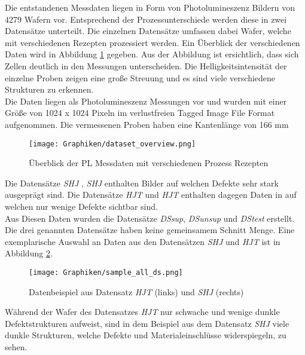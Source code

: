   Die entstandenen Messdaten liegen in Form von Photolumineszenz Bildern von 4279 Wafern vor. Entsprechend der Prozessunterschiede werden diese in zwei Datensätze unterteilt. Die einzelnen Datensätze umfassen dabei Wafer, welche mit verschiedenen Rezepten prozessiert werden. Ein Überblick der verschiedenen Daten wird in Abbildung \ref{fig:dataset_overview} gegeben. Aus der Abbildung ist ersichtlich, dass sich Zellen deutlich in den Messungen unterscheiden. Die Helligkeitsintensität der einzelne Proben zeigen eine große Streuung und es sind viele verschiedene Strukturen zu erkennen. \\
  Die Daten liegen als Photolumineszenz Messungen vor und wurden mit einer Größe von 1024 x 1024 Pixeln im verlustfreien Tagged Image File Format aufgenommen. Die vermessenen Proben haben eine Kantenlänge von 166 mm %

  \begin{figure}[h!]
      \centering
      \texttt{[image: Graphiken/dataset\_overview.png]}
      \caption{Überblick der PL Messdaten mit verschiedenen Prozess Rezepten}
      \label{fig:dataset_overview}
  \end{figure}
 

  Die Datensätze \textit{SHJ }, \textit{SHJ} 
  enthalten Bilder auf welchen Defekte sehr stark ausgeprägt sind. Die Datensätze \textit{HJT} und \textit{HJT} enthalten dagegen Daten in auf welchen nur wenige Defekte sichtbar sind.\\
  Aus Diesen Daten wurden die Datensätze \textit{DS\textunderscore sup}, \textit{DS\textunderscore unsup} und \textit{DS\textunderscore test} erstellt. Die drei genannten Datensätze haben keine gemeinsamem Schnitt Menge.
  Eine exemplarische Auswahl an Daten aus den Datensätzen \textit{SHJ} und \textit{HJT } ist in Abbildung \ref{fig:hjt_1_SHJ_1}.\\

  \begin{figure}[hbt!]
      \centering
      \texttt{[image: Graphiken/sample\_all\_ds.png]}
      \caption{Datenbeispiel aus Datensatz \textit{HJT }(links) und \textit{SHJ }(rechts)}
      \label{fig:hjt_1_SHJ_1}
  \end{figure}
  
  Während der Wafer des Datensatzes \textit{HJT } nur schwache und wenige dunkle Defektstrukturen aufweist, sind in dem Beispiel aus dem Datensatz \textit{SHJ } viele dunkle Strukturen, welche Defekte und Materialeinschlüsse widerspiegeln, zu sehen. 


